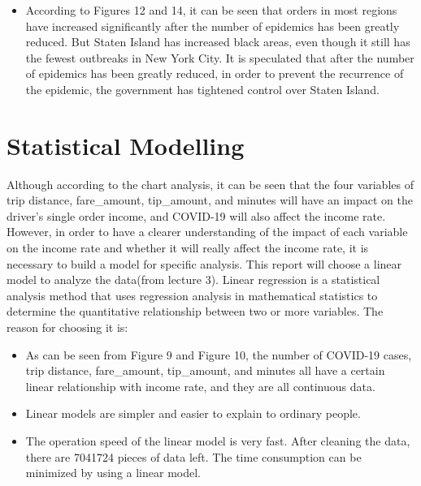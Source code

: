 \documentclass[11pt]{article}
\begin{document}
\begin{itemize}
    \item According to Figures 12 and 14, it can be seen that orders in most regions have increased significantly after the number of epidemics has been greatly reduced. But Staten Island has increased black areas, even though it still has the fewest outbreaks in New York City. It is speculated that after the number of epidemics has been greatly reduced, in order to prevent the recurrence of the epidemic, the government has tightened control over Staten Island.
\end{itemize}
\section{Statistical Modelling}
Although according to the chart analysis, it can be seen that the four variables of trip distance, fare\_amount, tip\_amount, and minutes will have an impact on the driver's single order income, and COVID-19 will also affect the income rate. However, in order to have a clearer understanding of the impact of each variable on the income rate and whether it will really affect the income rate, it is necessary to build a model for specific analysis.
This report will choose a linear model to analyze the data(from lecture 3). Linear regression is a statistical analysis method that uses regression analysis in mathematical statistics to determine the quantitative relationship between two or more variables. The reason for choosing it is:
\begin{itemize}
    \item As can be seen from Figure 9 and Figure 10, the number of COVID-19 cases, trip distance, fare\_amount, tip\_amount, and minutes all have a certain linear relationship with income rate, and they are all continuous data.
\end{itemize}
\begin{itemize}
    \item Linear models are simpler and easier to explain to ordinary people.
\end{itemize}
\begin{itemize}
    \item The operation speed of the linear model is very fast. After cleaning the data, there are 7041724 pieces of data left. The time consumption can be minimized by using a linear model.
\end{itemize}
\end{document}
